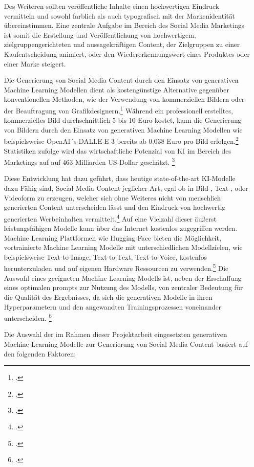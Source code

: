 Des Weiteren sollten veröffentliche Inhalte einen hochwertigen Eindruck vermitteln und sowohl farblich als auch typografisch mit der Markenidentität übereinstimmen.
Eine zentrale Aufgabe im Bereich des Social Media Marketings ist somit die Erstellung und Veröffentlichung von hochwertigem, zielgruppengerichteten und aussagekräftigen Content, der Zielgruppen zu einer Kaufentscheidung animiert, oder den Wiedererkennungswert eines Produktes oder einer Marke steigert.

Die Generierung von Social Media Content durch den Einsatz von generativen Machine Learning Modellen dient als kostengünstige Alternative gegenüber konventionellen Methoden, wie der Verwendung von kommerziellen Bildern oder der Beauftragung von Grafikdesignern.\footcite[1-2]{hartmann2024power}
Während ein professionell erstelltes, kommerzielles Bild durchschnittlich 5 bis 10 Euro kostet, kann die Generierung von Bildern durch den Einsatz von generativen Machine Learning Modellen wie beispielsweise OpenAI´s DALLE-E 3 bereits ab 0,038 Euro pro Bild erfolgen.\footcite{betker2023improving}
Statistiken zufolge wird das wirtschaftliche Potenzial von KI im Bereich des Marketings auf auf 463 Milliarden US-Dollar geschätzt. \footcite{chui2023economic}

Diese Entwicklung hat dazu geführt, dass heutige state-of-the-art KI-Modelle dazu Fähig sind, Social Media Content jeglicher Art, egal ob in Bild-, Text-, oder Videoform zu erzeugen, welcher sich ohne Weiteres nicht von menschlich generierten Content unterscheiden lässt und den Eindruck von hochwertig generierten Werbeinhalten vermittelt.\footcite[1]{hartmann2024power}
Auf eine Vielzahl dieser äußerst leistungsfähigen Modelle kann über das Internet kostenlos zugegriffen werden.
Machine Learning Plattformen wie Hugging Face bieten die Möglichkeit, vortrainierte Machine Learning Modelle mit unterschiedlichen Modellzielen, wie beispielsweise Text-to-Image, Text-to-Text, Text-to-Voice, kostenlos herunterzuladen und auf eigenen Hardware Ressourcen zu verwenden.\footcite{huggingface}
Die Auswahl eines geeigneten Machine Learning Modells ist, neben der Erschaffung eines optimalen prompts zur Nutzung des Modells, von zentraler Bedeutung für die Qualität des Ergebnisses, da sich die generativen Modelle in ihren Hyperparametern und den angewandten Trainingsprozessen voneinander unterscheiden. \footcite[S. 9 ff.]{betker2023improving}

Die Auswahl der im Rahmen dieser Projektarbeit eingesetzten generativen Machine Learning Modelle zur Generierung von Social Media Content basiert auf den folgenden Faktoren:

